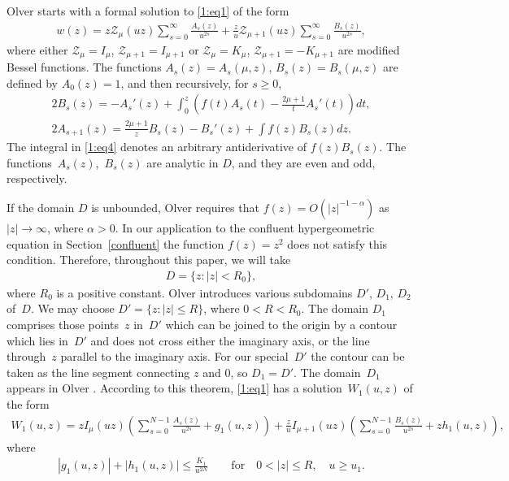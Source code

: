 \documentclass[pdftex]{sigma}
\newcommand{\Z}{\mathbb{Z}}
\renewcommand{\Z}{\mathcal{Z}}
\numberwithin{equation}{section}
\begin{document}
Olver \cite[(7.4)]{O} starts with a formal solution to \eqref{1:eq1} of the form
\begin{gather*}%
 w(z)=z\Z_\mu(uz)\sum_{s=0}^\infty \frac{A_s(z)}{u^{2s}}+\frac{z}{u}\Z_{\mu+1}(uz)\sum_{s=0}^\infty \frac{B_s(z)}{u^{2s}} ,
\end{gather*}
where either $\Z_\mu=I_\mu$, $\Z_{\mu+1}=I_{\mu+1}$ or $\Z_\mu=K_\mu$, $\Z_{\mu+1}=-K_{\mu+1}$ are modif\/ied Bessel functions.
The functions $A_s(z)=A_s(\mu,z)$, $B_s(z)=B_s(\mu,z)$ are def\/ined by $A_0(z)=1$, and then recursively, for $s\ge 0$,
\begin{gather}
2B_s(z) = -A_s'(z)+\int_0^z\left(f(t)A_s(t)-\frac{2\mu+1}{t} A_s'(t)\right) dt,\label{1:eq3}\\
2A_{s+1}(z) = \frac{2\mu+1}{z} B_s(z)- B_s'(z)+\int f(z)B_s(z) dz.\label{1:eq4}
\end{gather}
The integral in \eqref{1:eq4} denotes an arbitrary antiderivative of $f(z)B_s(z)$.
The func\-tions~$A_s(z)$,~$B_s(z)$ are analytic in $D$, and they are even and odd, respectively.

If the domain $D$ is unbounded, Olver \cite[p.~77]{O} requires that $f(z)=O(|z|^{-1-\alpha})$ as $|z|\to\infty$, where $\alpha>0$.
In our application to the conf\/luent hypergeometric equation in Section~\ref{confluent} the function $f(z)=z^2$ does not satisfy this condition.
Therefore, throughout this paper, we will take
\begin{gather}\label{1:D}
 D=\{z\colon |z|<R_0\},
 \end{gather}
where $R_0$ is a positive constant.
Olver \cite[p.~77]{O} introduces various subdomains $D'$, $D_1$, $D_2$ of~$D$.
We may choose $D'=\{z\colon |z|\le R\}$, where $0<R<R_0$. The domain $D_1$ comprises those points~$z$ in~$D'$ which can be joined to the origin by a contour
which lies in~$D'$ and does not cross either the imaginary axis, or the line through~$z$ parallel to the imaginary axis.
For our special~$D'$ the contour can be taken as the line segment connecting $z$ and $0$, so $D_1=D'$. The domain~$D_1$ appears in
Olver \cite[Theorem~D(i)]{O}. According to this theorem, \eqref{1:eq1} has a solu\-tion~$W_1(u,z)$ of the form
\begin{gather}\label{1:W1}
W_1(u,z)=zI_\mu(uz)\left(\sum_{s=0}^{N-1} \frac{A_s(z)}{u^{2s}}+g_1(u,z)\right)
+\frac{z}{u}I_{\mu+1}(uz)\left(\sum_{s=0}^{N-1} \frac{B_s(z)}{u^{2s}}+zh_1(u,z)\right),\!\!\!
\end{gather}
where
\begin{gather}\label{1:W1a}
 |g_1(u,z)|+|h_1(u,z)|\le \frac{K_1}{u^{2N}}\qquad \text{for} \quad 0<|z|\le R,\quad u\ge u_1 .
\end{gather}
\end{document}
